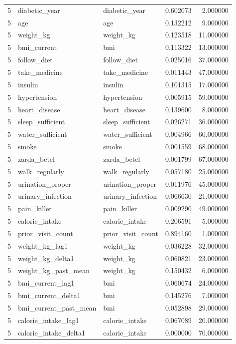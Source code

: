 \begin{longtable}{rllrr}
5 & diabetic\_year & diabetic\_year & 0.602073 & 2.000000 \\
5 & age & age & 0.132212 & 9.000000 \\
5 & weight\_kg & weight\_kg & 0.123518 & 11.000000 \\
5 & bmi\_current & bmi & 0.113322 & 13.000000 \\
5 & follow\_diet & follow\_diet & 0.025016 & 37.000000 \\
5 & take\_medicine & take\_medicine & 0.011443 & 47.000000 \\
5 & insulin & insulin & 0.101315 & 17.000000 \\
5 & hypertension & hypertension & 0.005915 & 59.000000 \\
5 & heart\_disease & heart\_disease & 0.139600 & 8.000000 \\
5 & sleep\_sufficient & sleep\_sufficient & 0.026271 & 36.000000 \\
5 & water\_sufficient & water\_sufficient & 0.004966 & 60.000000 \\
5 & smoke & smoke & 0.001559 & 68.000000 \\
5 & zarda\_betel & zarda\_betel & 0.001799 & 67.000000 \\
5 & walk\_regularly & walk\_regularly & 0.057180 & 25.000000 \\
5 & urination\_proper & urination\_proper & 0.011976 & 45.000000 \\
5 & urinary\_infection & urinary\_infection & 0.066630 & 21.000000 \\
5 & pain\_killer & pain\_killer & 0.009290 & 49.000000 \\
5 & calorie\_intake & calorie\_intake & 0.206591 & 5.000000 \\
5 & prior\_visit\_count & prior\_visit\_count & 0.894160 & 1.000000 \\
5 & weight\_kg\_lag1 & weight\_kg & 0.036228 & 32.000000 \\
5 & weight\_kg\_delta1 & weight\_kg & 0.060821 & 23.000000 \\
5 & weight\_kg\_past\_mean & weight\_kg & 0.150432 & 6.000000 \\
5 & bmi\_current\_lag1 & bmi & 0.060674 & 24.000000 \\
5 & bmi\_current\_delta1 & bmi & 0.145276 & 7.000000 \\
5 & bmi\_current\_past\_mean & bmi & 0.052898 & 29.000000 \\
5 & calorie\_intake\_lag1 & calorie\_intake & 0.067089 & 20.000000 \\
5 & calorie\_intake\_delta1 & calorie\_intake & 0.000000 & 70.000000 \\

\end{longtable}
